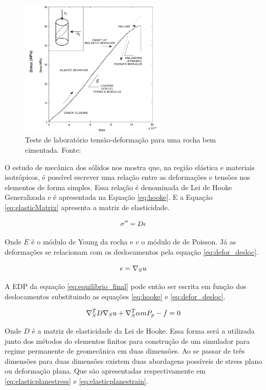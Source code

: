 \begin{figure}[!htbp]
\centering
\includegraphics[width=7cm]{chap01/stress_strain.PNG}
\caption{Teste de laboratório tensão-deformação para uma rocha bem cimentada. Fonte: \cite{ResGeomec}}
\label{fig:stress_strain}
\end{figure}


O estudo de mecânica dos sólidos nos mostra que, na região elástica e materiais isotrópicos, é possível escrever uma relação entre as deformações e tensões nos elementos de forma simples. Essa relação é denominada de Lei de Hooke Generalizada e é apresentada na Equação \eqref{eq:hooke}. E a Equação \eqref{eq:elasticMatrix} apresenta a matriz de elasticidade.


\begin{equation}{
\label{eq:hooke}
\fontsize{4}{4}\selectfont
\sigma ^{\prime\prime}= D \epsilon
}
\end{equation}



Onde $E$ é o módulo de Young da rocha e $v$ o módulo de de Poisson. Já as deformações se relacionam com os deslocamentos pela equação \eqref{eq:defor_desloc}.

\begin{equation}
\label{eq:defor_desloc}
\epsilon = \nabla_S u
\end{equation}


A EDP da equação \eqref{eq:equilibrio_final} pode então ser escrita em função dos deslocamentos substituindo as equações \eqref{eq:hooke} e \eqref{eq:defor_desloc}.

\begin{equation}
\label{eq:edp_geomec}
\nabla_S^TD \nabla_S u + \nabla_S^T\alpha m P_p - f = 0
\end{equation}

Onde $D$ é a matriz de elasticidade da Lei de Hooke. Essa forma será a utilizada junto dos métodos do elementos finitos para construção de um simulador para regime permanente de geomecânica em duas dimensões. Ao se passar
de três dimensões para duas dimensões existem duas abordagens possíveis de stress plano ou deformação plana. Que são apresentadas respectivamente em \eqref{eq:elasticplanestress} e \eqref{eq:elasticplanestrain}.

